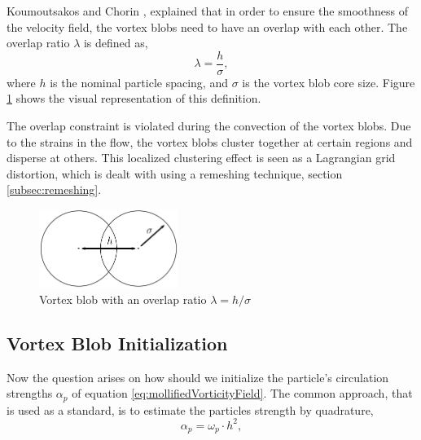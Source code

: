 Koumoutsakos and Chorin \cite{Cottet2000a}, explained that in order to ensure the smoothness of the velocity field, the vortex blobs need to have an overlap with each other. The overlap ratio $\lambda$ is defined as,
	\begin{equation}
	\lambda = \frac{h}{\sigma},
	\label{eq:overlapRatio}
	\end{equation}
where $h$ is the nominal particle spacing, and $\sigma$ is the vortex blob core size. Figure \ref{fig:blobOverlap} shows the visual representation of this definition. 

The overlap constraint is violated during the convection of the vortex blobs. Due to the strains in the flow, the vortex blobs cluster together at certain regions and disperse at others. This localized clustering effect is seen as a Lagrangian grid distortion, which is dealt with using a remeshing technique, section \ref{subsec:remeshing}.

	\begin{figure}[!t]
	\centering
	\includegraphics[width=0.4\textwidth]{figures/lagrangian/blobOverlap.pdf}
	\caption{Vortex blob with an overlap ratio $\lambda = h/\sigma$}
	\label{fig:blobOverlap}
	\end{figure}

\subsection{Vortex Blob Initialization}
\label{subsec:vortexBlobInitialization}
Now the question arises on how should we initialize the particle's circulation strengths $\alpha_p$ of equation 	\ref{eq:mollifiedVorticityField}. The common approach, that is used as a standard, is to estimate the particles strength by quadrature,
	\begin{equation}
	\alpha_p = \omega_p\cdot h^2,
	\label{eq:particleCirculationAssignment}
	\end{equation}

